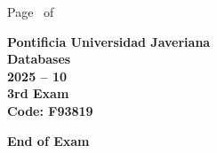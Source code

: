 \documentclass[11pt, addpoints]{exam}\usepackage[utf8]{inputenc}
\begin{document}
\begin{coverpages}
\begin{center}
			\vspace{3mm}
			\leavevmode \hspace{5mm} 
		\end{center}
	\end{coverpages}

	\footer{} {Page \thepage\ of \numpages} {}

	\centering
	\textbf{\Large Pontificia Universidad Javeriana}\\
	\textbf{\Large Databases} \\
	\textbf{\large 2025 -- 10} \\
	\textbf{\large 3rd Exam} \\
	\textbf{Code: F93819}


	\begin{questions}
		
		
		
		
		
		
		
		
		
		
		
		
		
		
		
		
		
		
		
		
	\end{questions}

	\vspace{5mm}
	\noindent \textbf{End of Exam}
\end{document}
